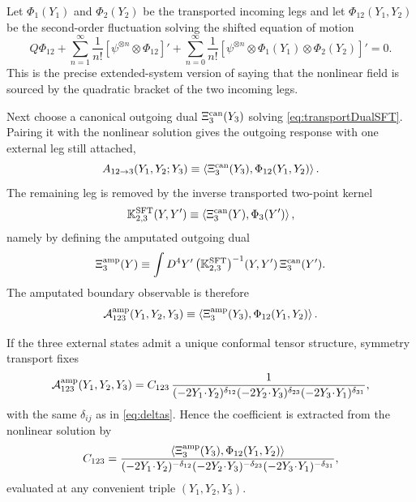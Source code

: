 \documentclass[11pt]{article}
\begin{document}
Let $\Phi_1(Y_1)$ and $\Phi_2(Y_2)$ be the transported incoming legs and let $\Phi_{12}(Y_1,Y_2)$ be the second-order fluctuation solving the shifted equation of motion
\begin{equation}
Q\Phi_{12}
+\sum_{n=1}^\infty \frac{1}{n!}[\psi^{\otimes n}\otimes \Phi_{12}]'
+\sum_{n=0}^\infty \frac{1}{n!}[\psi^{\otimes n}\otimes \Phi_1(Y_1)\otimes \Phi_2(Y_2)]'
=0.
\label{eq:Phi12eq}
\end{equation}
This is the precise extended-system version of saying that the nonlinear field is sourced by the quadratic bracket of the two incoming legs.

Next choose a canonical outgoing dual $\Xi_3^{\rm can}(Y_3)$ solving \cref{eq:transportDualSFT}. Pairing it with the nonlinear solution gives the outgoing response with one external leg still attached,
\begin{equation}
A_{12\to 3}(Y_1,Y_2;Y_3)
\equiv
\left\langle
\Xi_3^{\rm can}(Y_3),\Phi_{12}(Y_1,Y_2)
\right\rangle.
\label{eq:responseSFT}
\end{equation}
The remaining leg is removed by the inverse transported two-point kernel
\begin{equation}
\mathbb{K}^{\rm SFT}_{2,3}(Y,Y')
\equiv
\left\langle
\Xi_3^{\rm can}(Y),\Phi_3(Y')
\right\rangle,
\label{eq:K2SFT3}
\end{equation}
namely by defining the amputated outgoing dual
\begin{equation}
\Xi_3^{\rm amp}(Y)
\equiv
\int D^4Y'\,
\big(\mathbb{K}^{\rm SFT}_{2,3}\big)^{-1}(Y,Y')\,
\Xi_3^{\rm can}(Y').
\label{eq:Xiamp}
\end{equation}
The amputated boundary observable is therefore
\begin{equation}
\mathcal{A}_{123}^{\rm amp}(Y_1,Y_2,Y_3)
\equiv
\left\langle
\Xi_3^{\rm amp}(Y_3),\Phi_{12}(Y_1,Y_2)
\right\rangle.
\label{eq:AampSFT}
\end{equation}

If the three external states admit a unique conformal tensor structure, symmetry transport fixes
\begin{equation}
\mathcal{A}_{123}^{\rm amp}(Y_1,Y_2,Y_3)
=
C_{123}\,
\frac{1}
{(-2Y_1\!\cdot\!Y_2)^{\delta_{12}}
 (-2Y_2\!\cdot\!Y_3)^{\delta_{23}}
 (-2Y_3\!\cdot\!Y_1)^{\delta_{31}}},
\label{eq:AampStruct}
\end{equation}
with the same $\delta_{ij}$ as in \cref{eq:deltas}. Hence the coefficient is extracted from the nonlinear solution by
\begin{equation}
C_{123}
=
\frac{
\left\langle
\Xi_3^{\rm amp}(Y_3),\Phi_{12}(Y_1,Y_2)
\right\rangle
}
{(-2Y_1\!\cdot\!Y_2)^{-\delta_{12}}
 (-2Y_2\!\cdot\!Y_3)^{-\delta_{23}}
 (-2Y_3\!\cdot\!Y_1)^{-\delta_{31}}},
\label{eq:Cextract}
\end{equation}
evaluated at any convenient triple $(Y_1,Y_2,Y_3)$.
\end{document}
